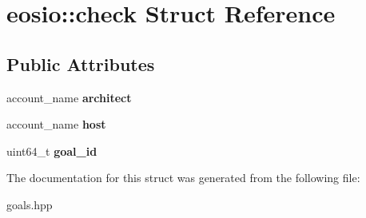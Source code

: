\hypertarget{structeosio_1_1check}{}\section{eosio\+:\+:check Struct Reference}
\label{structeosio_1_1check}
\subsection*{Public Attributes}
\begin{DoxyCompactItemize}
\item 
\mbox{\label{structeosio_1_1check_adeef42c50ed7df90874821a52da44f4f}} 
account\+\_\+name {\bfseries architect}
\item 
\mbox{\label{structeosio_1_1check_a6244cdb47ced3e5c76dff499f9b98e94}} 
account\+\_\+name {\bfseries host}
\item 
\mbox{\label{structeosio_1_1check_a4e19c8659cac6c0aae6eaaffc89f86d0}} 
uint64\+\_\+t {\bfseries goal\+\_\+id}
\end{DoxyCompactItemize}


The documentation for this struct was generated from the following file\+:\begin{DoxyCompactItemize}
\item 
goals.\+hpp\end{DoxyCompactItemize}
